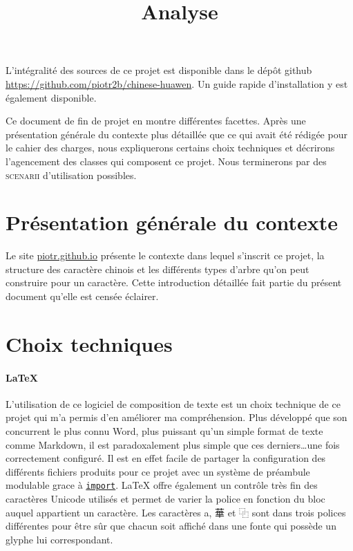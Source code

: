 \documentclass[12pt,onecolumn]{article}
\title{Analyse}
\begin{document}

\maketitle

L'intégralité des sources de ce projet est disponible dans le dépôt github \url{https://github.com/piotr2b/chinese-huawen}. Un guide rapide d'installation y est également disponible.

Ce document de fin de projet en montre différentes facettes. Après une présentation générale du contexte plus détaillée que ce qui avait été rédigée pour le cahier des charges, nous expliquerons certains choix techniques et décrirons l'agencement des classes qui composent ce projet. Nous terminerons par des \textsc{scenarii} d'utilisation possibles.

\tableofcontents

\section{Présentation générale du contexte}

Le site \url{piotr.github.io} présente le contexte dans lequel s'inscrit ce projet, la structure des caractère chinois et les différents types d'arbre qu'on peut construire pour un caractère. Cette introduction détaillée fait partie du présent document qu'elle est censée éclairer.

\section{Choix techniques}

\paragraph{\LaTeX{}} L'utilisation de ce logiciel de composition de texte est un choix technique de ce projet qui m'a permis d'en améliorer ma compréhension. Plus développé que son concurrent le plus connu Word, plus puissant qu'un simple format de texte comme Markdown, il est paradoxalement plus simple que ces derniers\dots une fois correctement configuré. Il est en effet facile de partager la configuration des différents fichiers produits pour ce projet avec un système de préambule modulable grace à \href{http://ctan.mines-albi.fr/macros/latex/contrib/import/import.pdf}{\texttt{import}}. \LaTeX{} offre également un contrôle très fin des caractères Unicode utilisés et permet de varier la police en fonction du bloc auquel appartient un caractère. Les caractères a, 華 et ⿻ sont dans trois polices différentes pour être sûr que chacun soit affiché dans une fonte qui possède un glyphe lui correspondant.
\end{document}
